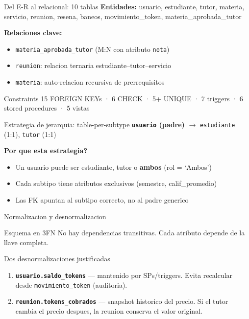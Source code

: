 ﻿\documentclass[11pt,aspectratio=169]{beamer}
\begin{document}
\begin{frame}{Del E-R al relacional: 10 tablas}
    \textbf{Entidades:} usuario, estudiante, tutor, materia, servicio, reunion, resena, baneos, movimiento\_token, materia\_aprobada\_tutor

    \vspace{0.2cm}
    \textbf{Relaciones clave:}
    \begin{itemize}
        \item \texttt{materia\_aprobada\_tutor} (M:N con atributo \texttt{nota})
        \item \texttt{reunion}: relacion ternaria estudiante--tutor--servicio
        \item \texttt{materia}: auto-relacion recursiva de prerrequisitos
    \end{itemize}
    \begin{block}{Constraints}
        15 FOREIGN KEYs · 6 CHECK · 5+ UNIQUE · 7 triggers · 6 stored procedures · 5 vistas
    \end{block}
\end{frame}

\begin{frame}{Estrategia de jerarquia: table-per-subtype}
    \textbf{\texttt{usuario} (padre)} $\rightarrow$ \texttt{estudiante} (1:1), \texttt{tutor} (1:1)

    \vspace{0.2cm}
    \textbf{Por que esta estrategia?}
    \begin{itemize}
        \item Un usuario puede ser estudiante, tutor o \textbf{ambos} (rol = `Ambos')
        \item Cada subtipo tiene atributos exclusivos (semestre, calif\_promedio)
        \item Las FK apuntan al subtipo correcto, no al padre generico
    \end{itemize}
\end{frame}

\begin{frame}{Normalizacion y desnormalizacion}
    \begin{block}{Esquema en 3FN}
        No hay dependencias transitivas. Cada atributo depende de la llave completa.
    \end{block}
    \begin{block}{Dos desnormalizaciones justificadas}
        \begin{enumerate}
            \item \textbf{\texttt{usuario.saldo\_tokens}} --- mantenido por SPs/triggers. Evita recalcular desde \texttt{movimiento\_token} (auditoria).
            \item \textbf{\texttt{reunion.tokens\_cobrados}} --- snapshot historico del precio. Si el tutor cambia el precio despues, la reunion conserva el valor original.
        \end{enumerate}
    \end{block}
\end{frame}
\end{document}
